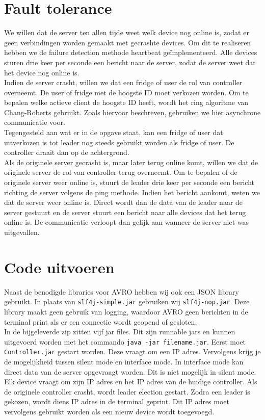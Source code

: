 \documentclass[a4paper]{article}
\begin{document}
	
	\section{Fault tolerance}
		We willen dat de server ten allen tijde weet welk device nog online is, zodat er geen verbindingen worden gemaakt met gecrashte devices. Om dit te realiseren hebben we de failure detection methode heartbeat ge\"implementeerd. Alle devices sturen drie keer per seconde een bericht naar de server, zodat de server weet dat het device nog online is. \\
		Indien de server crasht, willen we dat een fridge of user de rol van controller overneemt. De user of fridge met de hoogste ID moet verkozen worden. Om te bepalen welke actieve client de hoogste ID heeft, wordt het ring algoritme van Chang-Roberts gebruikt. Zoals hiervoor beschreven, gebruiken we hier asynchrone communicatie voor. \\
		Tegengesteld aan wat er in de opgave staat, kan een fridge of user dat uitverkozen is tot leader nog steeds gebruikt worden als fridge of user. De controller draait dan op de achtergrond. \\
		Als de originele server gecrasht is, maar later terug online komt, willen we dat de originele server de rol van controller terug overneemt. Om te bepalen of de originele server weer online is, stuurt de leader drie keer per seconde een bericht richting de server volgens de ping methode. Indien het bericht aankomt, weten we dat de server weer online is. Direct wordt dan de data van de leader naar de server gestuurt en de server stuurt een bericht naar alle devices dat het terug online is. De communicatie verloopt dan gelijk aan wanneer de server niet was uitgevallen.
	
	\section{Code uitvoeren}
		Naast de benodigde libraries voor AVRO hebben wij ook een JSON library gebruikt. In plaats van \texttt{slf4j-simple.jar} gebruiken wij \texttt{slf4j-nop.jar}. Deze library maakt geen gebruik van logging, waardoor AVRO geen berichten in de terminal print als er een connectie wordt geopend of gesloten. \\\medskip
		In de bijgeleverde zip zitten vijf jar files. Dit zijn runnable jars en kunnen uitgevoerd worden met het commando \texttt{java -jar filename.jar}. Eerst moet \texttt{Controller.jar} gestart worden. Deze vraagt om een IP adres. Vervolgens krijg je de mogelijkheid tussen silent mode en interface mode. In interface mode kan direct data van de server opgevraagt worden. Dit is niet mogelijk in silent mode. \\
		Elk device vraagt om zijn IP adres en het IP adres van de huidige controller. Als de originele controller crasht, wordt leader election gestart. Zodra een leader is gekozen, wordt diens IP adres in de terminal geprint. Dit IP adres moet vervolgens gebruikt worden als een nieuw device wordt toegevoegd. 
	
\end{document}

